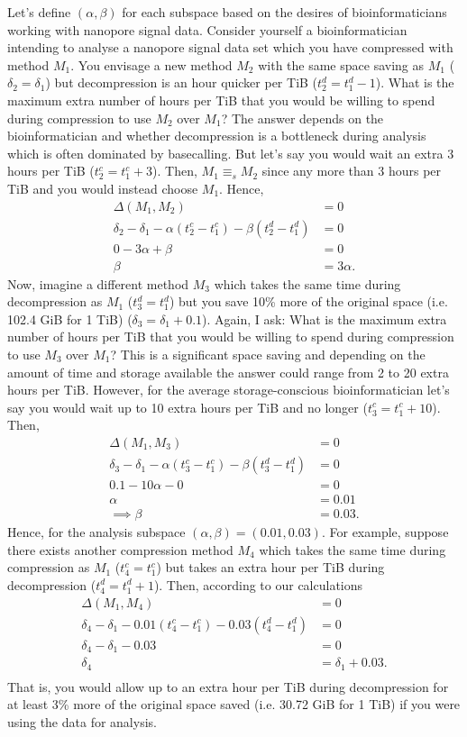 Let's define $(\alpha,\beta)$ for each subspace based on the desires of
bioinformaticians working with nanopore signal data. Consider yourself a
bioinformatician intending to analyse a nanopore signal data set which you have
compressed with method $M_1$. You envisage a new method $M_2$ with the same
space saving as $M_1$ ($\delta_2=\delta_1$) but decompression is an hour quicker
per TiB ($t^d_2=t^d_1-1$). What is the maximum extra number of hours per TiB
that you would be willing to spend during compression to use $M_2$ over $M_1$?
The answer depends on the bioinformatician and whether decompression is a
bottleneck during analysis which is often dominated by basecalling. But let's
say you would wait an extra 3 hours per TiB ($t^c_2=t^c_1+3$). Then,
$M_1\equiv_sM_2$ since any more than 3 hours per TiB and you would instead
choose $M_1$. Hence,
\begin{align*}
	\Delta(M_1,M_2)&=0\\
	\delta_2-\delta_1-\alpha(t^c_2-t^c_1) - \beta(t^d_2-t^d_1) &= 0\\
	0-3\alpha + \beta &= 0\\
	\beta &= 3\alpha.
\end{align*}
Now, imagine a different method $M_3$ which
takes the same time during decompression as $M_1$ ($t^d_3=t^d_1$) but you save
10\% more of the original space (i.e. 102.4 GiB for 1 TiB) ($\delta_3=\delta_1+0.1$).
Again, I ask:
What is the maximum extra number of hours per TiB that you would be willing to
spend during compression to use $M_3$ over $M_1$? This is a significant space
saving
and depending on the amount of time and storage available the answer could
range from 2 to 20 extra hours per TiB. However, for the average
storage-conscious bioinformatician let's say you would wait up to 10 extra hours
per TiB and no longer ($t^c_3=t^c_1+10$). Then,
\begin{align*}
	\Delta(M_1,M_3)&=0\\
	\delta_3-\delta_1 - \alpha(t^c_3-t^c_1) - \beta(t^d_3-t^d_1) &= 0\\
	0.1 - 10\alpha - 0 &=0\\
	\alpha&=0.01\\
	\implies \beta&=0.03.
\end{align*}
Hence, for the analysis subspace $(\alpha,\beta)=(0.01,0.03)$. For example,
suppose there exists another compression method $M_4$ which takes the same time
during compression as $M_1$ ($t_4^c=t_1^c$) but takes an extra hour per TiB
during decompression ($t_4^d=t_1^d+1$). Then, according to our calculations
\begin{align*}
	\Delta(M_1,M_4)&=0\\
	\delta_4-\delta_1 - 0.01(t^c_4-t^c_1) - 0.03(t^d_4-t^d_1) &= 0\\
	\delta_4-\delta_1 - 0.03 &= 0\\
	\delta_4&=\delta_1 + 0.03.\\
\end{align*}
That is, you would allow up to an extra hour per TiB during decompression for at
least 3\% more of the original space saved (i.e. 30.72 GiB for 1 TiB) if you were
using the data for analysis.

